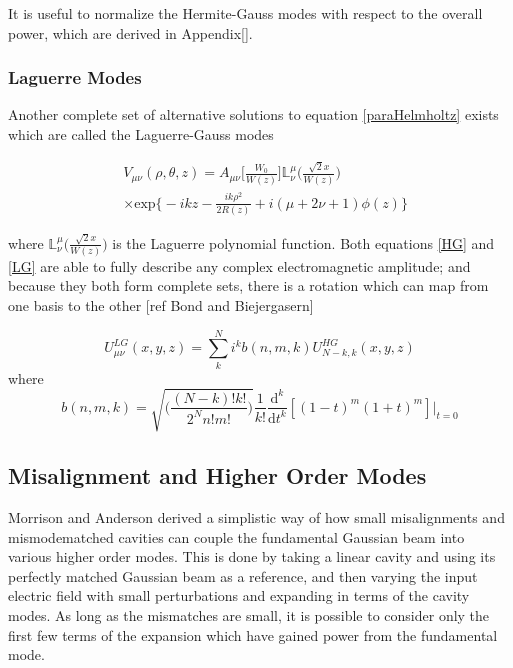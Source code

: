 \documentclass[oneside]{book}
\begin{document}
		It is useful to normalize the Hermite-Gauss modes with respect to the overall power, which are derived in Appendix[].
		
		
		
		\subsubsection{Laguerre Modes}
		Another complete set of alternative solutions to equation \ref{paraHelmholtz} exists which are called the Laguerre-Gauss modes
		
		\begin{equation}\label{LG}
		\begin{aligned}
		&V_{\mu\nu}(\rho,\theta,z) = A_{\mu\nu}\bigg[ \frac{W_0}{W(z)} \bigg] \mathbb{L}^{\mu}_{\nu} \Bigg( \frac{\sqrt{2}x}{W(z)}  \Bigg) \\
		&\times \text{exp} \bigg\{-ikz-\frac{ik\rho^2}{2R(z)} + i(\mu+2\nu+1)\phi(z) \bigg\}
		\end{aligned}
		\end{equation}
		
		where $\mathbb{L}^{\mu}_{\nu} \Bigg( \frac{\sqrt{2}x}{W(z)}  \Bigg)$ is the Laguerre polynomial function. Both equations \ref{HG} and \ref{LG} are able to fully describe any complex electromagnetic amplitude; and because they both form complete sets, there is a rotation which can map from one basis to the other [ref Bond and Biejergasern]
		
		\begin{equation}
		U^{LG}_{\mu \nu} (x,y,z) = \sum\limits_{k}^{N} i^k b(n,m,k) U^{HG}_{N-k,k} (x,y,z)
		\end{equation}
		where
		\begin{equation}
		b(n,m,k) = \sqrt{\bigg( \frac{(N-k)!k!}{2^N n!m!} \bigg)} \frac{1}{k!} \frac{\text{d}^k}{\text{d}t^k}[(1-t)^m (1+t)^m]\vert_{t=0}
		\end{equation}

		\subsection{Misalignment and Higher Order Modes}\label{Misalign}
		Morrison and Anderson derived a simplistic way of how small misalignments and mismodematched cavities can couple the fundamental Gaussian beam into various higher order modes.  This is done by taking a linear cavity and using its perfectly matched Gaussian beam as a reference, and then varying the input electric field with small perturbations and expanding in terms of the cavity modes.  As long as the mismatches are small, it is possible to consider only the first few terms of the expansion which have gained power from the fundamental mode.
		
\end{document}
